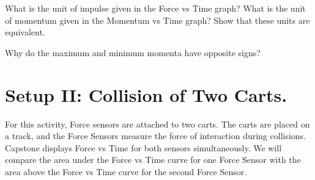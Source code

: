 \documentclass[main.tex]{subfiles}
\begin{document}
\begin{question}
What is the unit of impulse given in the Force vs Time graph? What is the unit of momentum given in the Momentum vs Time graph? Show that these units are equivalent.
\end{question}
\begin{question}
Why do the maximum and minimum momenta have opposite signs?
\end{question}

\section{Setup II: Collision of Two Carts.}
For this activity, Force sensors are attached to two carts. The carts are placed on a track, and the Force Sensors measure the force of interaction during collisions. Capstone displays Force vs Time for both sensors simultaneously. We will compare the area under the Force vs Time curve for one Force Sensor with the area above the Force vs Time curve for the second Force Sensor.
\end{document}
